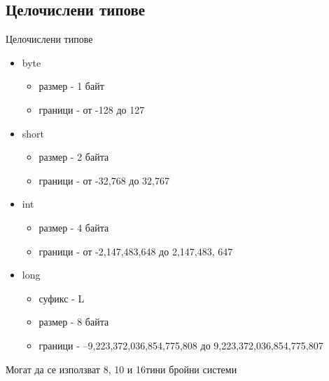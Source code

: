 \documentclass{beamer}
\begin{document}
\subsection{Целочислени типове}
\begin{frame}{Целочислени типове}
  \transdissolve
  \begin{itemize}
  \item byte
    \begin{itemize}
    \item размер - 1 байт
    \item граници - от -128 до 127
    \end{itemize} \pause
  \item short
    \begin{itemize}
    \item размер - 2 байта
    \item граници - от -32,768 до 32,767
    \end{itemize} \pause
  \item int
    \begin{itemize}
      \item размер - 4 байта
      \item граници - от -2,147,483,648 до
        2,147,483, 647
    \end{itemize} \pause
  \item long
    \begin{itemize}
    \item суфикс - L
    \item размер - 8 байта
    \item граници - –9,223,372,036,854,775,808 до
      9,223,372,036,854,775,807
    \end{itemize} \pause
  \end{itemize}
  Могат да се използват 8, 10 и 16тини
  бройни системи
\end{frame}
\end{document}
